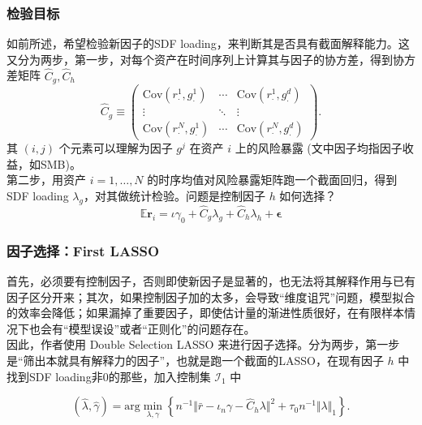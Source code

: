 \documentclass[
  UTF8,
  xcolor={dvipsnames,rgb},
  hyperref={colorlinks, citecolor=orange, linkcolor=black},
  aspectratio=169
  ]{beamer}
\begin{document}
\begin{frame}[label=main]
    \frametitle{检验目标}
    如前所述，希望检验新因子的SDF loading，来判断其是否具有截面解释能力。这又分为两步，第一步，对每个资产在时间序列上计算其与因子的协方差，得到协方差矩阵 \(\hat{C}_g, \hat{C}_h\)
    \[
        \hat{C}_{g} \equiv  \begin{pmatrix}
        \mathrm{Cov}(r_{\cdot}^{1},g_{\cdot}^{1}) & \cdots & \mathrm{Cov}(r_{\cdot}^{1},g_{\cdot}^{d}) \\
        \vdots & \ddots & \vdots \\
        \mathrm{Cov}(r_{\cdot}^{N},g_{\cdot}^{1}) & \cdots & \mathrm{Cov}(r_{\cdot}^{N},g_{\cdot}^{d})
        \end{pmatrix}
    .\]
    其 \((i,j)\) 个元素可以理解为因子 \(g^{j}\) 在资产 \(i\) 上的风险暴露 (文中因子均指因子收益，如SMB)。\hyperlink{appendix1}{}
    \\
    \vspace{1em}
    第二步，用资产 \(i=1, \ldots ,N\) 的时序均值对风险暴露矩阵跑一个截面回归，得到SDF loading \(\lambda_g\)，对其做统计检验。问题是控制因子 \(h\) 如何选择？
    \[\mathbb{E} \boldsymbol{r}_{i} =\iota \gamma_{0}+\hat{C}_{g}\lambda_{g}+\hat{C}_{h}\lambda_{h}+\boldsymbol{\epsilon}\]
\end{frame}

\begin{frame}
    \frametitle{因子选择：First LASSO}
    首先，必须要有控制因子，否则即使新因子是显著的，也无法将其解释作用与已有因子区分开来；其次，如果控制因子加的太多，会导致``维度诅咒''问题，模型拟合的效率会降低；如果漏掉了重要因子，即使估计量的渐进性质很好，在有限样本情况下也会有``模型误设''或者``正则化''的问题存在。
    \\
    \vspace{1em}
    因此，作者使用 Double Selection LASSO 来进行因子选择。分为两步，第一步是``筛出本就具有解释力的因子''，也就是跑一个截面的LASSO，在现有因子 \(h\) 中找到SDF loading非0的那些，加入控制集 \(\mathcal{I}_1\) 中

    \[( \hat{\lambda},\hat{\gamma} ) = \textrm{arg} \min_{\lambda,\gamma} \left\{ n^{-1} \Vert \bar{r}-\iota_{n}\gamma-\hat{C}_{h}\lambda \Vert^{2} + \tau_{0}n^{-1} \Vert \lambda \Vert_{1} \right\} .\]

\end{frame}
\end{document}
